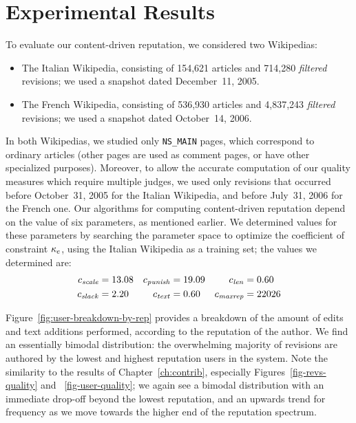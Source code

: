 \section{Experimental Results}

To evaluate our content-driven reputation, we considered two Wikipedias:
%
\begin{itemize}

\item The Italian Wikipedia, consisting of 154,621 articles and 714,280
  {\em filtered\/} revisions; we used a snapshot dated December~11, 2005.
\item The French Wikipedia, consisting of 536,930 articles and
  4,837,243 {\em filtered\/} revisions; we used a snapshot dated
  October~14, 2006.

\end{itemize}
%
In both Wikipedias, we studied only \texttt{NS\_MAIN} pages, which
correspond to ordinary articles (other pages are used as comment
pages, or have other specialized purposes).
Moreover, to allow the accurate computation of our quality
measures which require multiple judges,
we used only revisions that occurred before October~31, 2005 for
the Italian Wikipedia, and before July~31, 2006 for the French one.
Our algorithms for computing content-driven reputation depend on the
value of six parameters, as mentioned earlier.
We determined values for these parameters by searching the parameter
space to optimize the coefficient of constraint $\kappa_e$, using the Italian
Wikipedia as a training set; the values we determined are:
%
\begin{align*}
   {c_{{\text{\textit{scale}}}}}      & = 13.08
  & {c_{{\text{\textit{punish}}}}}   & = 19.09
  & {c_{{\text{\textit{len}}}}}     & = 0.60   \\
   {c_{{\text{\textit{slack}}}}}         & = 2.20
  & {c_{{\text{\textit{text}}}}}     & = 0.60
  & {c_{{\text{\textit{maxrep}}}}}   & = 22026
\end{align*}

Figure~\ref{fig:user-breakdown-by-rep} provides a breakdown of
the amount of edits and text additions performed, according to the
reputation of the author.
We find an essentially bimodal distribution:
the overwhelming majority of revisions are authored by the
lowest and highest reputation users in the system.
Note the similarity to the results of Chapter~\ref{ch:contrib},
especially Figures~\ref{fig-revs-quality} and ~\ref{fig-user-quality};
we again see a bimodal distribution with an immediate drop-off beyond
the lowest reputation, and an upwards trend for frequency as we move
towards the higher end of the reputation spectrum.


